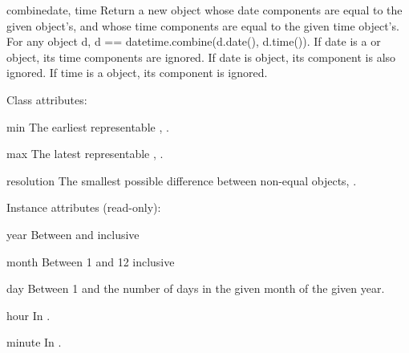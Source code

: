 \begin{methoddesc}{combine}{date, time}
    Return a new  object whose date components are
    equal to the given  object's, and whose time components are
    equal to the given time object's.  For any  object
    d, d == datetime.combine(d.date(), d.time()).
    If date is a  or  object, its
    time components are ignored.  If date is 
    object, its  component is also ignored.  If time is
    a  object, its  component is ignored.
\end{methoddesc}

Class attributes:

\begin{memberdesc}{min}
        The earliest representable ,
        .
\end{memberdesc}

\begin{memberdesc}{max}
        The latest representable ,
        .
\end{memberdesc}

\begin{memberdesc}{resolution}
        The smallest possible difference between non-equal 
        objects, .
\end{memberdesc}

Instance attributes (read-only):

\begin{memberdesc}{year}
Between  and  inclusive
\end{memberdesc}

\begin{memberdesc}{month}
Between 1 and 12 inclusive
\end{memberdesc}

\begin{memberdesc}{day}
Between 1 and the number of days in the given month
                    of the given year.
\end{memberdesc}

\begin{memberdesc}{hour}
In .
\end{memberdesc}

\begin{memberdesc}{minute}
In .
\end{memberdesc}


